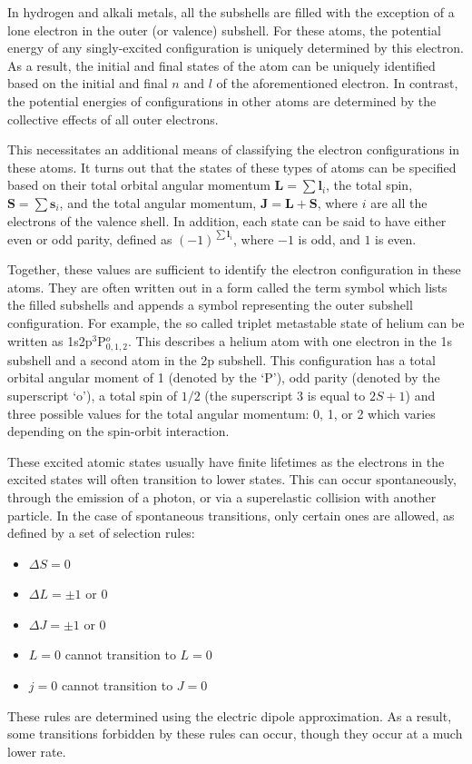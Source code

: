 In hydrogen and alkali metals, all the subshells are filled with the exception
of a lone electron in the outer (or valence) subshell. For these atoms, the
potential energy of any singly-excited configuration is uniquely determined by
this electron. As a result, the initial and final states of the atom can be
uniquely identified based on the initial and final $n$ and $l$ of the
aforementioned electron. In contrast, the potential energies of configurations
in other atoms are determined by the collective effects of all outer electrons.

This necessitates an additional means of classifying the electron configurations
in these atoms. It turns out that the states of these types of atoms can be
specified based on their total orbital angular momentum $\bm{L}=\sum \bm{l}_i$,
the total spin, $\bm{S}=\sum \bm{s}_i$, and the total angular momentum,
$\bm{J}=\bm{L}+\bm{S}$, where $i$ are all the electrons of the valence shell. In
addition, each state can be said to have either even or odd parity, defined as
$(-1)^{\sum\bm{l}_i}$, where $-1$ is odd, and $1$ is even.

Together, these values are sufficient to identify the electron configuration in
these atoms. They are often written out in a form called the term symbol which
lists the filled subshells and appends a symbol representing the outer subshell
configuration. For example, the so called triplet metastable state of helium can
be written as 1s2p$^3$P$^o_{0,1,2}$. This describes a helium atom with one
electron in the 1s subshell and a second atom in the 2p subshell. This
configuration has a total orbital angular moment of 1 (denoted by the `P'), odd
parity (denoted by the superscript `o'), a total spin of $1/2$ (the superscript
$3$ is equal to $2S+1$) and three possible values for the total angular
momentum: 0, 1, or 2 which varies depending on the spin-orbit interaction.

These excited atomic states usually have finite lifetimes as the electrons in
the excited states will often transition to lower states. This can occur
spontaneously, through the emission of a photon, or via a superelastic collision
with another particle. In the case of spontaneous transitions, only certain ones
are allowed, as defined by a set of selection rules:
\begin{itemize}
  \item $\Delta S = 0$
  \item $\Delta L = \pm1$ or 0
  \item $\Delta J = \pm1$ or 0
  \item $L=0$ cannot transition to $L=0$
  \item $j=0$ cannot transition to $J=0$
\end{itemize}
These rules are determined using the electric dipole approximation. As a result,
some transitions forbidden by these rules can occur, though they occur at a much
lower rate.

